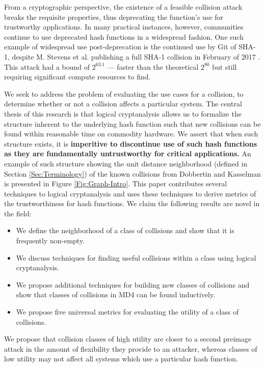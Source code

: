 \documentclass[conference]{IEEEtran}
\begin{document}
From a cryptographic perspective, the existence of a feasible collision attack
breaks the requisite properties, thus deprecating the function's use
for trustworthy applications. In many practical instances, however,
communities continue to use deprecated hash functions in a widespread fashion.
One such example of widespread use post-deprecation is the continued use by Git of SHA-1, despite
M. Stevens et al. publishing a full SHA-1 collision in February of 2017
\cite{cryptoeprint:2017:190}. This attack had a bound of $2^{63.1}$
--- faster than the theoretical $2^{80}$ but still requiring significant compute
resources to find.

We seek to address the problem of evaluating the use cases for a collision,
to determine whether or not a collision affects a particular system.
The central thesis of this research is that logical cryptanalysis
allows us to formalize the structure inherent to the underlying hash
function such that new collisions can be found within reasonable time
on commodity hardware.  We assert that when such structure exists, it
is \textbf{imperitive to discontinue use of such hash functions as
  they are fundamentally untrustworthy for critical applications.}  An
example of such structure showing the unit distance neighborhood
(defined in Section \ref{Sec:Terminology}) of the known collisions
from Dobbertin and Kasselman is presented in Figure \ref{Fig:Graph-Intro}.
This paper contributes several techniques to logical cryptanalysis and uses these
techniques to derive metrics of the trustworthiness for hash functions. We claim
the following results are novel in the field:
\begin{itemize}
    \item We define the neighborhood of a class of collisions and show that
        it is frequently non-empty.
    \item We discuss techniques for finding useful collisions within a
        class using logical cryptanalysis.
    \item We propose additional techniques for building new classes of
        collisions and show that classes of collisions in MD4 can be found inductively.
    \item We propose five universal metrics for evaluating the utility of
        a class of collisions.
\end{itemize}
We propose that collision classes of high utility are closer to a second
preimage attack in the amount of flexibility they provide to an attacker,
whereas classes of low utility may not affect all systems which use a
particular hash function.
\end{document}
